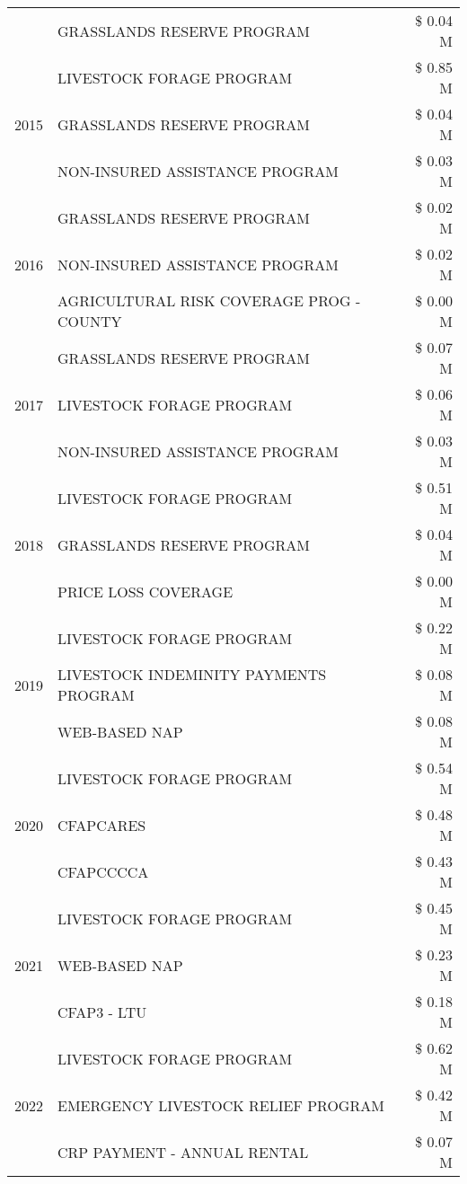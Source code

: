 \begin{tabular}{llr}
 & GRASSLANDS RESERVE PROGRAM & \$ 0.04 M \\
\cline{1-3}
\multirow[t]{3}{*}{2015} & LIVESTOCK FORAGE PROGRAM & \$ 0.85 M \\
 & GRASSLANDS RESERVE PROGRAM & \$ 0.04 M \\
 & NON-INSURED ASSISTANCE PROGRAM & \$ 0.03 M \\
\cline{1-3}
\multirow[t]{3}{*}{2016} & GRASSLANDS RESERVE PROGRAM & \$ 0.02 M \\
 & NON-INSURED ASSISTANCE PROGRAM & \$ 0.02 M \\
 & AGRICULTURAL RISK COVERAGE PROG - COUNTY & \$ 0.00 M \\
\cline{1-3}
\multirow[t]{3}{*}{2017} & GRASSLANDS RESERVE PROGRAM & \$ 0.07 M \\
 & LIVESTOCK FORAGE PROGRAM & \$ 0.06 M \\
 & NON-INSURED ASSISTANCE PROGRAM & \$ 0.03 M \\
\cline{1-3}
\multirow[t]{3}{*}{2018} & LIVESTOCK FORAGE PROGRAM & \$ 0.51 M \\
 & GRASSLANDS RESERVE PROGRAM & \$ 0.04 M \\
 & PRICE LOSS COVERAGE & \$ 0.00 M \\
\cline{1-3}
\multirow[t]{3}{*}{2019} & LIVESTOCK FORAGE PROGRAM & \$ 0.22 M \\
 & LIVESTOCK INDEMINITY PAYMENTS PROGRAM & \$ 0.08 M \\
 & WEB-BASED NAP & \$ 0.08 M \\
\cline{1-3}
\multirow[t]{3}{*}{2020} & LIVESTOCK FORAGE PROGRAM & \$ 0.54 M \\
 & CFAPCARES & \$ 0.48 M \\
 & CFAPCCCCA & \$ 0.43 M \\
\cline{1-3}
\multirow[t]{3}{*}{2021} & LIVESTOCK FORAGE PROGRAM & \$ 0.45 M \\
 & WEB-BASED NAP & \$ 0.23 M \\
 & CFAP3 - LTU & \$ 0.18 M \\
\cline{1-3}
\multirow[t]{3}{*}{2022} & LIVESTOCK FORAGE PROGRAM & \$ 0.62 M \\
 & EMERGENCY LIVESTOCK RELIEF PROGRAM & \$ 0.42 M \\
 & CRP PAYMENT - ANNUAL RENTAL & \$ 0.07 M \\
\cline{1-3}
\bottomrule
\end{tabular}
